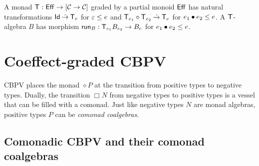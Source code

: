 \documentclass[acmsmall,review,anonymous]{acmart}\settopmatter{printfolios=true,printccs=false,printacmref=false}
\newcommand{\graybox}[1]{\grayboxtext{$#1$}}
\begin{document}
A monad $\T : \Eff \to [\CC \to \CC]$ graded by a partial monoid
$\Eff$ has natural transformations $\Id \todot \T[e]$ for $\Ge \leq e$
and $\T[e_1] \circ \T[e_2] \todot \T[e]$ for $e_1 \bu e_2 \leq e$.  A
$\T$-algebra $B$ has morphism $\run[B] : \T[e_1]B_{e_2} \to B_{e}$
for $e_1 \bu e_2 \leq e$.



\section{Coeffect-graded CBPV}
\label{sec:coeff}

\newcommand{\lolli}{\multimap}
\newcommand{\qfun}[3]{#1#2 \lolli #3}
\newcommand{\gqfun}[3]{\graybox{#1#2 \lolli #3}}
\newcommand{\nbox}[1]{}
\newcommand{\tzip}{\mathsf{zip}}
\newcommand{\textract}{\mathsf{extract}}
\newcommand{\extract}[1][]{\textract_{#1}}
\newcommand{\tdisplay}{\mathsf{display}}
\newcommand{\display}[1][]{\tdisplay_{#1}}
\newcommand{\tduplicate}{\mathsf{duplicate}}
\newcommand{\duplicate}[1][]{\tduplicate_{#1}}
\newcommand{\tcobind}{\mathsf{cobind}}
\newcommand{\tbind}{\mathsf{bind}}
\newcommand{\tget}{\mathsf{get}}
\newcommand{\tmodify}{\mathsf{modify}}
\newcommand{\thead}{\mathsf{head}}
\newcommand{\ttail}{\mathsf{tail}}
\newcommand{\suc}{(\_{+}1)}
\newcommand{\Float}{\mathsf{Float}}
\newcommand{\tiso}{\mathsf{iso}}
\newcommand{\isot}{\tiso^\otimes}

CBPV places the monad $\diamond P$ at the transition from positive
types to negative types.  Dually, the transition $\Box N$ from
negative types to positive types is a vessel that can be filled with a
comonad.  Just like negative types $N$ are monad algebras, positive
types $P$ can be \emph{comonad coalgebras}.

\subsection{Comonadic CBPV and their comonad coalgebras}

\end{document}
